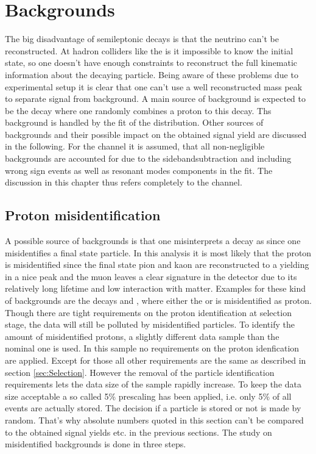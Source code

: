 \chapter{Backgrounds}
\label{sec:Backgrounds}

The big disadvantage of semileptonic decays is that the neutrino can't be reconstructed.
At hadron colliders like the \lhc is it impossible to know the initial state, so one doesn't have enough constraints to reconstruct the full kinematic information about the decaying particle.
Being aware of these problems due to experimental setup it is clear that one can't use a well reconstructed \Lb mass peak to separate signal from background.
A main source of background is expected to be the decay  where one randomly combines a proton to this decay.
Ths background is handled by the fit of the \logIP distribution.
Other sources of backgrounds and their possible impact on the obtained signal yield \NDp are discussed in the following.
For the \LbToLcmunu channel it is assumed, that all non-negligible backgrounds are accounted for due to the sidebandsubtraction and including wrong sign events as well as resonant modes components in the fit.
The discussion in this chapter thus refers completely to the \LbToDpmunuX channel.

\section{Proton misidentification}
A possible source of backgrounds is that one misinterprets a decay as \LbToDpmunuX since one misidentifies a final state particle.
In this analysis it is most likely that the proton is misidentified since the final state pion and kaon are reconstructed to a \Dz yielding in a nice peak and the muon leaves a clear signature in the detector due to its relatively long lifetime and low interaction with matter.
Examples for these kind of backgrounds are the decays  and , where either the \Kp or \pip is misidentified as proton.
Though there are tight requirements on the proton identification at selection stage, the data will still be polluted by misidentified particles.
To identify the amount of misidentified protons, a slightly different data sample than the nominal one is used. 
In this sample no requirements on the proton idenfication are applied.
Except for those all other requirements are the same as described in section \ref{sec:Selection}.
However the removal of the particle identification requirements lets the data size of the sample rapidly increase.
To keep the data size acceptable a so called 5\% prescaling has been applied, i.e. only 5\% of all events are actually stored.
The decision if a particle is stored or not is made by random.
That's why absolute numbers quoted in this section can't be compared to the obtained signal yields etc. in the previous sections.
The study on misidentified backgrounds is done in three steps.


